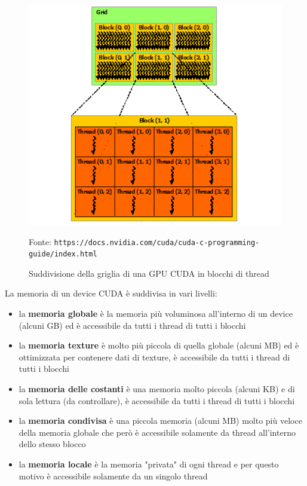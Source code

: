 \documentclass[12pt,a4paper]{book}
\newcommand{\source}[1]{\caption*{Fonte: {\small\texttt{#1}}} }
\begin{document}
	\begin{figure}[!ht]
		\centering
		\includegraphics[width=0.7\linewidth]{grid-of-thread-blocks}
		\caption[Struttura della griglia di una GPU CUDA]{Suddivisione della griglia di una GPU CUDA in blocchi di thread}
		\source{https://docs.nvidia.com/cuda/cuda-c-programming-guide/index.html}
		\label{fig:grid-of-thread-blocks}
	\end{figure}
	
	La memoria di un device CUDA è suddivisa in vari livelli:
	\begin{itemize}
		\item la \textbf{memoria globale} è la memoria più voluminosa all'interno di un device (alcuni GB) ed è accessibile da tutti i thread di tutti i blocchi
		\item la \textbf{memoria texture} è molto più piccola di quella globale (alcuni MB) ed è ottimizzata per contenere dati di texture, è accessibile da tutti i thread di tutti i blocchi
		\item la \textbf{memoria delle costanti} è una memoria molto piccola (alcuni KB) e di sola lettura (da controllare), è accessibile da tutti i thread di tutti i blocchi
		\item la \textbf{memoria condivisa} è una piccola memoria (alcuni MB) molto più veloce della memoria globale che però è accessibile solamente da thread all'interno dello stesso blocco
		\item la \textbf{memoria locale} è la memoria "privata" di ogni thread e per questo motivo è accessibile solamente da un singolo thread
	\end{itemize}
	
\end{document}
